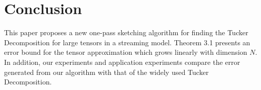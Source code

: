 \section{Conclusion}
This paper proposes a new one-pass sketching algorithm for finding the Tucker Decomposition for large tensors in a streaming model. Theorem 3.1 presents an error bound for the tensor approximation which grows linearly with dimension $N$. In addition, our experiments and application experiments compare the error generated from our algorithm with that of the widely used Tucker Decomposition. 